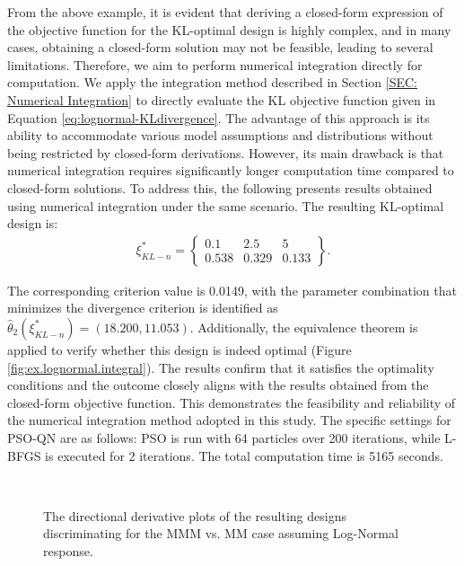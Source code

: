 \hspace*{8mm} From the above example, it is evident that deriving a closed-form expression of the objective function for the KL-optimal design is highly complex, and in many cases, obtaining a closed-form solution may not be feasible, leading to several limitations. Therefore, we aim to perform numerical integration directly for computation. We apply the integration method described in Section \ref{SEC: Numerical Integration} to directly evaluate the KL objective function given in Equation \eqref{eq:lognormal-KLdivergence}. The advantage of this approach is its ability to accommodate various model assumptions and distributions without being restricted by closed-form derivations. However, its main drawback is that numerical integration requires significantly longer computation time compared to closed-form solutions. To address this, the following presents results obtained using numerical integration under the same scenario. The resulting KL-optimal design is:
\begin{align*}
\xi^*_{KL-n} = \left\{\begin{array}{ccc}
0.1 & 2.5 & 5 \\
0.538 & 0.329 & 0.133
\end{array}\right\}.
\end{align*}

\hspace*{8mm} The corresponding criterion value is 0.0149, with the parameter combination that minimizes the divergence criterion is identified as $\hat{\theta}_2(\xi^*_{KL-n})=(18.200,11.053)$. Additionally, the equivalence theorem is applied to verify whether this design is indeed optimal (Figure \ref{fig:ex.lognormal.integral}). The results confirm that it satisfies the optimality conditions and the outcome closely aligns with the results obtained from the closed-form objective function. This demonstrates the feasibility and reliability of the numerical integration method adopted in this study. The specific settings for PSO-QN are as follows: PSO is run with 64 particles over 200 iterations, while L-BFGS is executed for 2 iterations. The total computation time is 5165 seconds.

\begin{figure}[H]
\centering
{}
 \\
\caption{The directional derivative plots of the resulting designs discriminating for the MMM vs. MM case assuming Log-Normal response.}
\label{fig:Fidalgo-lognormal}
\end{figure}

